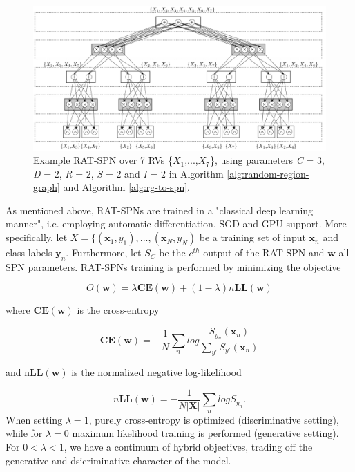 \begin{figure}[H]
\caption{Example RAT-SPN over 7 RVs \{$\mathit{X}_1$,...,$\mathit{X}_7$\}, using parameters \textit{C} = 3, \textit{D} = 2, \textit{R} = 2, \textit{S} = 2 and \textit{I} = 2 in Algorithm \ref{alg:random-region-graph} and Algorithm \ref{alg:rg-to-spn}.}
\label{fig:rat-spn}
\centering
\includegraphics[scale=0.265]{Figures/RAT-SPN.png}
\end{figure}
As mentioned above, RAT-SPNs are trained in a "classical deep learning manner", i.e. employing automatic differentiation, SGD and GPU support. More specifically, let $\mathit{X} = \{(\mathbf{x}_1,\mathit{y}_1),...,(\mathbf{x}_N,\mathit{y}_N)$ be a training set of input $\mathbf{x}_n$ and class labels $\mathbf{y}_n$. Furthermore, let $\mathit{S}_C$ be the $c^{th}$ output of the RAT-SPN and $\mathbf{w}$ all SPN parameters. RAT-SPNs training is performed by minimizing the objective

\begin{equation}\label{objective}
	O(\mathbf{w}) = \lambda \mathbf{CE}(\mathbf{w}) + (1-\lambda)n\mathbf{LL}(\mathbf{w})
\end{equation}

where $\mathbf{CE}(\mathbf{w})$ is the cross-entropy

\begin{equation}\label{cross-entropy}
	\mathbf{CE}(\mathbf{w}) = -\frac{1}{\mathit{N}}\sum_{n} log\frac{\mathit{S}_{\mathit{y_n}}(\mathbf{x}_n)}{\sum_{\mathit{y'}}\mathit{S}_{\mathit{y'}}(\mathbf{x}_n)}
\end{equation}

and n$\mathbf{LL}(\mathbf{w})$ is the normalized negative log-likelihood

\begin{equation}\label{nll}
	n\mathbf{LL}(\mathbf{w}) = -\frac{1}{\mathit{N}|\mathbf{X}|}\sum_{n} log\mathit{S}_{\mathit{y_n}}.
\end{equation}
When setting $\lambda = 1$, purely cross-entropy is optimized (discriminative setting), while for $\lambda = 0$ maximum likelihood training is performed (generative setting). For $0 < \lambda < 1$, we have a continuum of hybrid objectives, trading off the generative and dsicriminative character of the model.

